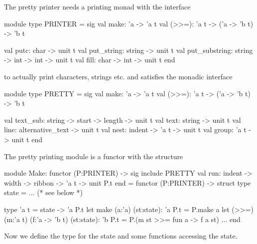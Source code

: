 \documentclass[12pt]{article}
\begin{document}
The pretty printer needs a printing monad with the interface
\begin{ocaml}
  module type PRINTER =
    sig
      val make:  'a -> 'a t
      val (>>=): 'a t -> ('a -> 'b t) -> 'b t

      val putc: char -> unit t
      val put_string: string -> unit t
      val put_substring: string -> int -> int -> unit t
      val fill: char -> int -> unit t
    end
\end{ocaml}
to actually print characters, strings etc. and satisfies the monadic interface
\begin{ocaml}
  module type PRETTY =
    sig
      val make:  'a -> 'a t
      val (>>=): 'a t -> ('a -> 'b t) -> 'b t

      val text_sub: string -> start -> length -> unit t
      val text: string -> unit t
      val line: alternative_text -> unit t
      val nest: indent -> 'a t -> unit t
      val group: 'a t -> unit t
    end
\end{ocaml}
%
The pretty printing module is a functor with the structure
\begin{ocaml}
  module Make:
    functor (P:PRINTER) ->
    sig
      include PRETTY
      val run: indent -> width -> ribbon -> 'a t -> unit P.t
    end =
    functor (P:PRINTER) ->
    struct
      type state = ... (* see below *)

      type 'a t = state -> 'a P.t
      let make (a:'a) (st:state): 'a P.t = P.make a
      let (>>=) (m:'a t) (f:'a -> 'b t) (st:state): 'b P.t =
        P.(m st >>= fun a -> f a st)
    ...
    end
\end{ocaml}
%
Now we define the type for the state and some functions accessing the state.
\end{document}

